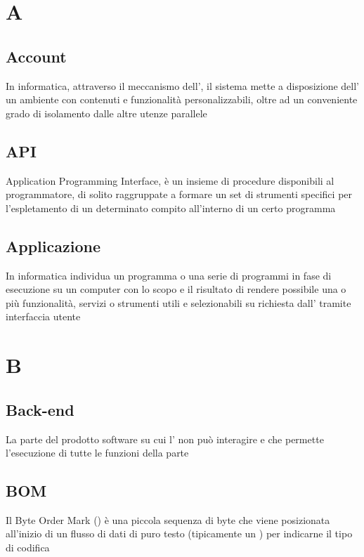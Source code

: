 \section{A}
\subsection{Account}
In informatica, attraverso il meccanismo dell', il sistema mette a disposizione dell' un ambiente con contenuti e funzionalità personalizzabili, oltre ad un conveniente grado di isolamento dalle altre utenze parallele


		\subsection{API}
		Application Programming Interface, è un insieme di procedure disponibili al programmatore, di solito raggruppate a formare un set di strumenti specifici per l'espletamento di un determinato compito all'interno di un certo programma


		\subsection{Applicazione}
	In informatica individua un programma o una serie di programmi in fase di esecuzione su un computer con lo scopo e il risultato di rendere possibile una o più funzionalità, servizi o strumenti utili e selezionabili su richiesta dall' tramite interfaccia utente

 \section{B}
 		\subsection{Back-end}
 	La parte del prodotto software su cui l' non può interagire e che permette l'esecuzione di tutte le funzioni della parte 


		\subsection{BOM}
		Il Byte Order Mark () è una piccola sequenza di byte che viene posizionata all'inizio di un flusso di dati di puro testo (tipicamente un ) per indicarne il tipo di codifica


